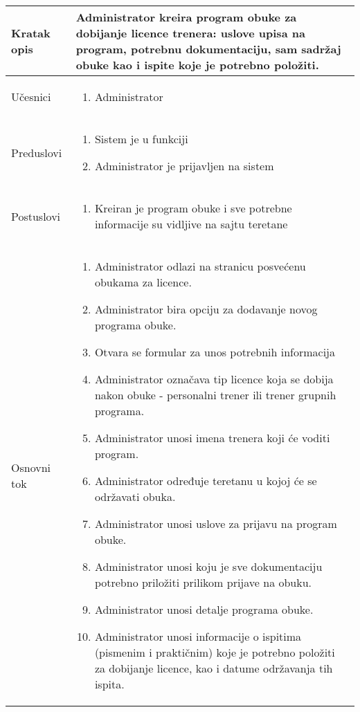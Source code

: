 \documentclass[../../main.tex]{subfiles}
\begin{document}
\begin{longtable}{| p{} | p{} |} 
\hline
    Kratak opis & Administrator kreira program obuke za dobijanje licence trenera: uslove upisa na program, potrebnu dokumentaciju, sam sadržaj obuke kao i ispite koje je potrebno položiti.  \\ 
\hline    
    Učesnici &
    \begin{enumerate}
        \item Administrator
    \end{enumerate}\\
\hline
   Preduslovi &
   \begin{enumerate}
        \item Sistem je u funkciji
        \item Administrator je prijavljen na sistem
    \end{enumerate}\\
\hline  
    Postuslovi & 
    \begin{enumerate}
        \item Kreiran je program obuke i sve potrebne informacije su vidljive na sajtu teretane
    \end{enumerate} \\
\hline
    Osnovni tok & 
    \begin{enumerate}
        \item Administrator odlazi na stranicu posvećenu obukama za licence.
        \item Administrator bira opciju za dodavanje novog programa obuke.
        \item Otvara se formular za unos potrebnih informacija 
        \item Administrator označava tip licence koja se dobija nakon obuke - personalni trener ili trener grupnih programa.
        \item Administrator unosi imena trenera koji će voditi program.
        \item Administrator određuje teretanu u kojoj će se održavati obuka.
        \item Administrator unosi uslove za prijavu na program obuke.
        \item Administrator unosi koju je sve dokumentaciju potrebno priložiti prilikom prijave na obuku.
        \item Administrator unosi detalje programa obuke.
        \item Administrator unosi informacije o ispitima (pismenim i praktičnim) koje je potrebno položiti za dobijanje licence, kao i datume održavanja tih ispita.

\end{enumerate}
\end{longtable}
\end{document}
